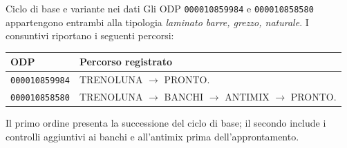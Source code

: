 \begin{examplebox}{Ciclo di base e variante nei dati}
Gli ODP \texttt{000010859984} e \texttt{000010858580} appartengono entrambi alla tipologia \emph{laminato barre, grezzo, naturale}. I consuntivi riportano i seguenti percorsi:

\begin{center}
\begin{tabularx}{\linewidth}{@{}l>{\raggedright\arraybackslash}X@{}}
\toprule
\textbf{ODP} & \textbf{Percorso registrato} \\
\midrule
\texttt{000010859984} & TRENOLUNA $\rightarrow$ PRONTO. \\
\addlinespace
\texttt{000010858580} & TRENOLUNA $\rightarrow$ BANCHI $\rightarrow$ ANTIMIX $\rightarrow$ PRONTO. \\
\bottomrule
\end{tabularx}
\end{center}

Il primo ordine presenta la successione del ciclo di base; il secondo include i controlli aggiuntivi ai banchi e all'antimix prima dell'approntamento.
\end{examplebox}
